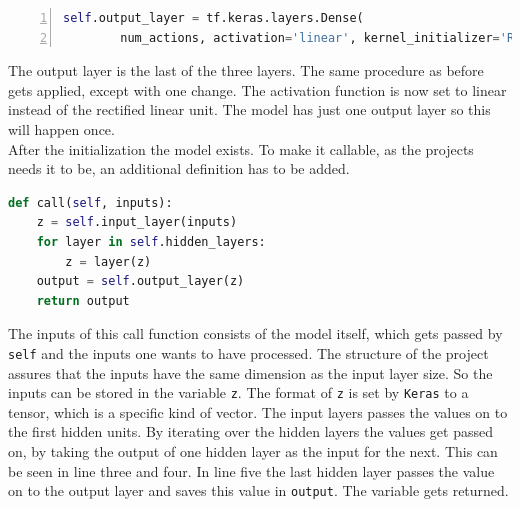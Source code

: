 \documentclass[12pt]{article}
\begin{document}
\lstset{ numbers=left, stepnumber=1,      firstnumber=8,  numberfirstline=true}
\begin{lstlisting}[language=Python,numbers=left]
    self.output_layer = tf.keras.layers.Dense(
        num_actions, activation='linear', kernel_initializer='RandomNormal')
\end{lstlisting}
The output layer is the last of the three layers. The same procedure as before gets applied, except with one change. The activation function is now set to linear instead of the rectified linear unit. The model has just one output layer so this will happen once.
\lstset{ numbers=left, stepnumber=1,firstnumber=1,  numberfirstline=true}
\\ After the initialization the model exists. To make it callable, as the projects needs it to be, an additional definition has to be added.
\begin{lstlisting}[language=Python, caption = Example - Making the model callable]
def call(self, inputs):
    z = self.input_layer(inputs) 
    for layer in self.hidden_layers: 
        z = layer(z) 
    output = self.output_layer(z) 
    return output
\end{lstlisting}
The inputs of this call function consists of the model itself, which gets passed by \lstinline{self} and the inputs one wants to have processed. The structure of the project assures that the inputs have the same dimension as the input layer size. So the inputs can be stored in the variable \lstinline{z}. The format of \lstinline{z} is set by \lstinline{Keras} to a tensor, which is a specific kind of vector. The input layers passes the values on to the first hidden units. By iterating over the hidden layers the values get passed on, by taking the output of one hidden layer as the input for the next. This can be seen in line three and four. In line five the last hidden layer passes the value on to the output layer and saves this value in \lstinline{output}. The variable gets returned.
\end{document}
